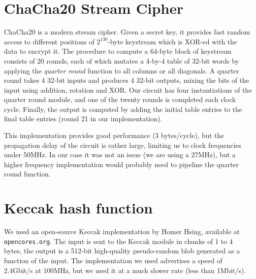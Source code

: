 \section{ChaCha20 Stream Cipher}\label{chacha20-stream-cipher}

ChaCha20 is a modern stream cipher. Given a secret key, it provides fast
random access to different positions of \(2^{130}\)-byte keystream which
is XOR-ed with the data to encrypt it. The procedure to compute a
64-byte block of keystream consists of 20 rounds, each of which mutates
a 4-by-4 table of 32-bit words by applying the \emph{quarter round}
function to all columns or all diagonals. A quarter round takes 4 32-bit
inputs and produces 4 32-bit outputs, mixing the bits of the input using
addition, rotation and XOR. Our circuit has four instantiations of the
quarter round module, and one of the twenty rounds is completed each
clock cycle. Finally, the output is computed by adding the initial table
entries to the final table entries (round 21 in our implementation).

This implementation provides good performance (3 bytes/cycle), but the
propagation delay of the circuit is rather large, limiting us to clock
frequencies under 50MHz. In our case it was not an issue (we are using a
27MHz), but a higher frequency implementation would probably need to
pipeline the quarter round function.

\section{Keccak hash function}\label{keccak-hash-function}

We used an open-source Keccak implementation by Homer Hsing, available
at \texttt{opencores.org}. The input is sent to the Keccak module in
chunks of 1 to 4 bytes, the output is a 512-bit high-quality
pseudo-random blob generated as a function of the input. The
implementation we used advertises a speed of 2.4Gbit/s at 100MHz, but we
used it at a much slower rate (less than 1Mbit/s).
